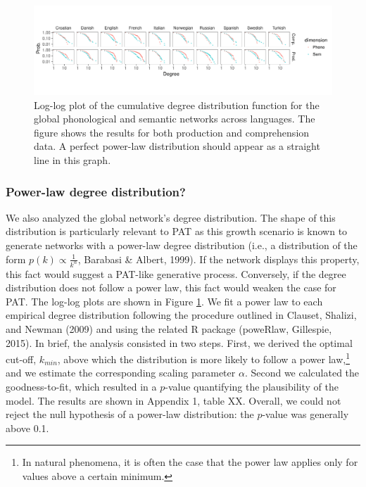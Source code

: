 \documentclass[english,floatsintext,man]{apa6}
\theoremstyle{definition}
\theoremstyle{definition}
\theoremstyle{definition}
\theoremstyle{remark}
\begin{document}
\begin{figure}[!h]
\includegraphics[width=\textwidth]{figs/plot_degree} \caption{Log-log plot of the cumulative degree distribution function for the global phonological and semantic networks across languages. The figure shows the results for both production and comprehension data. A perfect power-law distribution should appear as a straight line in this graph.}\label{fig:degreeDist}
\end{figure}

\subsubsection{Power-law degree
distribution?}\label{power-law-degree-distribution}

We also analyzed the global network's degree distribution. The shape of
this distribution is particularly relevant to PAT as this growth
scenario is known to generate networks with a power-law degree
distribution (i.e., a distribution of the form
\(p(k) \propto \frac{1}{k^{\alpha}}\), Barabasi \& Albert, 1999). If the
network displays this property, this fact would suggest a PAT-like
generative process. Conversely, if the degree distribution does not
follow a power law, this fact would weaken the case for PAT. The log-log
plots are shown in Figure \ref{fig:degreeDist}. We fit a power law to
each empirical degree distribution following the procedure outlined in
Clauset, Shalizi, and Newman (2009) and using the related R package
(poweRlaw, Gillespie, 2015). In brief, the analysis consisted in two
steps. First, we derived the optimal cut-off, \(k_{min}\), above which
the distribution is more likely to follow a power
law,\footnote{In natural phenomena, it is often the case that the power law applies only for values above a certain minimum.}
and we estimate the corresponding scaling parameter \(\alpha\). Second
we calculated the goodness-to-fit, which resulted in a \(p\)-value
quantifying the plausibility of the model. The results are shown in
Appendix 1, table XX. Overall, we could not reject the null hypothesis
of a power-law distribution: the \(p\)-value was generally above 0.1.
\end{document}
